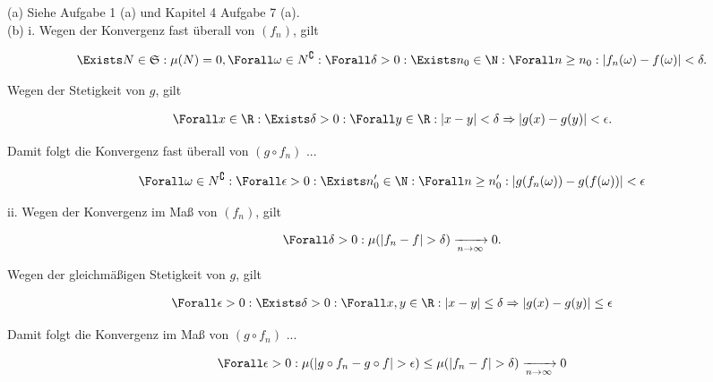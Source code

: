 \begin{solution}

(a) Siehe Aufgabe 1 (a) und Kapitel 4 Aufgabe 7 (a). \\

(b) i. Wegen der Konvergenz fast überall von $(f_n)$, gilt

\begin{align*}
  \Exists N \in \mathfrak{S}:
  \mu(N) = 0,
  \Forall \omega \in N^\complement:
  \Forall \delta > 0:
  \Exists n_0 \in \N:
  \Forall n \geq n_0:
  |f_n(\omega) - f(\omega)| < \delta.
\end{align*}

Wegen der Stetigkeit von $g$, gilt

\begin{align*}
  \Forall x \in \R:
  \Exists \delta > 0:
  \Forall y \in \R:
  |x - y| < \delta
  \Rightarrow
  |g(x) - g(y)| < \epsilon.
\end{align*}

Damit folgt die Konvergenz fast überall von $(g \circ f_n)$ ...

\begin{align*}
  \Forall \omega \in N^\complement:
  \Forall \epsilon > 0:
  \Exists n_0^\prime \in \N:
  \Forall n \geq n_0^\prime:
  |g(f_n(\omega)) - g(f(\omega))| < \epsilon
\end{align*}

ii. Wegen der Konvergenz im Maß von $(f_n)$, gilt

\begin{align*}
  \Forall \delta > 0:
  \mu(|f_n - f| > \delta)
  \xrightarrow[n \to \infty]{} 0.
\end{align*}

Wegen der gleichmäßigen Stetigkeit von $g$, gilt

\begin{align*}
  \Forall \epsilon > 0:
  \Exists \delta > 0:
  \Forall x, y \in \R:
  |x - y| \leq \delta
  \Rightarrow
  |g(x) - g(y)| \leq \epsilon
\end{align*}

Damit folgt die Konvergenz im Maß von $(g \circ f_n)$ ...

\begin{align*}
  \Forall \epsilon > 0:
  \mu(|g \circ f_n - g \circ f| > \epsilon)
  \leq
  \mu(|f_n - f| > \delta)
  \xrightarrow[n \to \infty]{} 0
\end{align*}

\end{solution}

